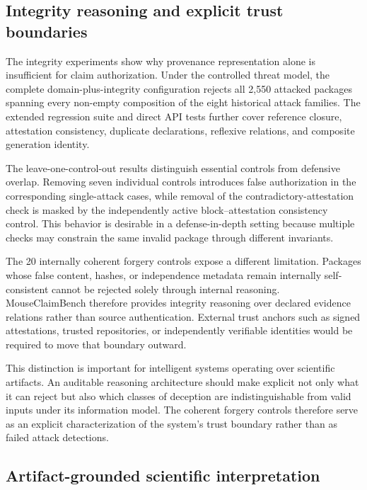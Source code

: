 \documentclass[11pt,a4paper]{article}
\begin{document}
\subsection{Integrity reasoning and explicit trust boundaries}
\label{subsec:integrity-discussion}

The integrity experiments show why provenance representation alone is
insufficient for claim authorization. Under the controlled threat model, the
complete domain-plus-integrity configuration rejects all 2,550 attacked
packages spanning every non-empty composition of the eight historical attack
families. The extended regression suite and direct API tests further cover
reference closure, attestation consistency, duplicate declarations, reflexive
relations, and composite generation identity.

The leave-one-control-out results distinguish essential controls from
defensive overlap. Removing seven individual controls introduces false
authorization in the corresponding single-attack cases, while removal of the
contradictory-attestation check is masked by the independently active
block--attestation consistency control. This behavior is desirable in a
defense-in-depth setting because multiple checks may constrain the same
invalid package through different invariants.

The 20 internally coherent forgery controls expose a different limitation.
Packages whose false content, hashes, or independence metadata remain
internally self-consistent cannot be rejected solely through internal
reasoning. MouseClaimBench therefore provides integrity reasoning over
declared evidence relations rather than source authentication. External trust
anchors such as signed attestations, trusted repositories, or independently
verifiable identities would be required to move that boundary outward.

This distinction is important for intelligent systems operating over
scientific artifacts. An auditable reasoning architecture should make explicit
not only what it can reject but also which classes of deception are
indistinguishable from valid inputs under its information model. The coherent
forgery controls therefore serve as an explicit characterization of the
system's trust boundary rather than as failed attack detections.


\subsection{Artifact-grounded scientific interpretation}
\label{subsec:artifact-interpretation}
\end{document}
